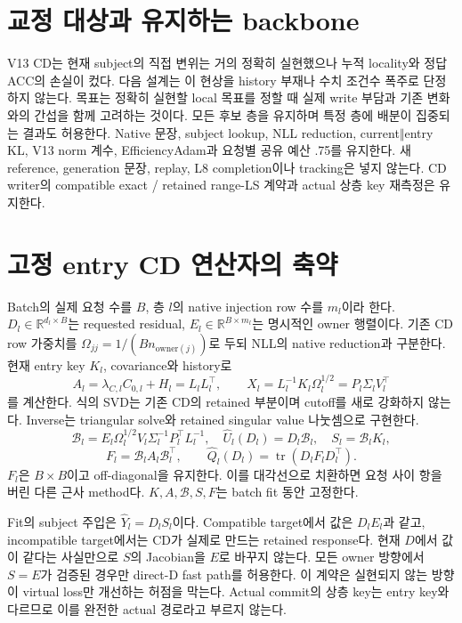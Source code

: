 \documentclass[11pt]{article}
\begin{document}
\section{교정 대상과 유지하는 backbone}
V13 CD는 현재 subject의 직접 변위는 거의 정확히 실현했으나 누적 locality와
정답 ACC의 손실이 컸다. 다음 설계는 이 현상을 history 부재나 수치 조건수 폭주로
단정하지 않는다. 목표는 정확히 실현할 local 목표를 정할 때 실제 write 부담과
기존 변화와의 간섭을 함께 고려하는 것이다. 모든 후보 층을 유지하며 특정 층에
배분이 집중되는 결과도 허용한다. Native 문장, subject lookup, NLL reduction,
current$\Vert$entry KL, V13 norm 계수, EfficiencyAdam과 요청별 공유 예산 .75를 유지한다.
새 reference, generation 문장, replay, L8 completion이나 tracking은 넣지 않는다.
CD writer의 compatible exact / retained range-LS 계약과 actual 상층 key 재측정은 유지한다.

\section{고정 entry CD 연산자의 축약}
Batch의 실제 요청 수를 $B$, 층 $l$의 native injection row 수를 $m_l$이라 한다.
$D_l\in\mathbb R^{d_l\times B}$는 requested residual, $E_l\in\mathbb R^{B\times m_l}$는
명시적인 owner 행렬이다. 기존 CD row 가중치를
$\Omega_{jj}=1/(B n_{\mathrm{owner}(j)})$로 두되 NLL의 native reduction과 구분한다.
현재 entry key $K_l$, covariance와 history로
\[
 A_l=\lambda_{C,l}C_{0,l}+H_l=L_lL_l^\top,\qquad
 X_l=L_l^{-1}K_l\Omega_l^{1/2}
     =P_l\Sigma_lV_l^\top
\]
를 계산한다. 식의 SVD는 기존 CD의 retained 부분이며 cutoff를 새로 강화하지 않는다.
Inverse는 triangular solve와 retained singular value 나눗셈으로 구현한다.
\[
 \mathcal B_l=E_l\Omega_l^{1/2}V_l\Sigma_l^{-1}P_l^\top L_l^{-1},\quad
 \widehat U_l(D_l)=D_l\mathcal B_l,\quad
 S_l=\mathcal B_lK_l,
\]
\[
 F_l=\mathcal B_lA_l\mathcal B_l^\top,\qquad
 \widehat Q_l(D_l)=\operatorname{tr}(D_lF_lD_l^\top).
\]
$F_l$은 $B\times B$이고 off-diagonal을 유지한다. 이를 대각선으로 치환하면
요청 사이 항을 버린 다른 근사 method다. $K,A,\mathcal B,S,F$는 batch fit 동안 고정한다.

Fit의 subject 주입은 $\widehat Y_l=D_lS_l$이다. Compatible target에서 값은
$D_lE_l$과 같고, incompatible target에서는 CD가 실제로 만드는 retained response다.
현재 $D$에서 값이 같다는 사실만으로 $S$의 Jacobian을 $E$로 바꾸지 않는다.
모든 owner 방향에서 $S=E$가 검증된 경우만 direct-D fast path를 허용한다.
이 계약은 실현되지 않는 방향이 virtual loss만 개선하는 허점을 막는다.
Actual commit의 상층 key는 entry key와 다르므로 이를 완전한 actual 경로라고 부르지 않는다.
\end{document}
